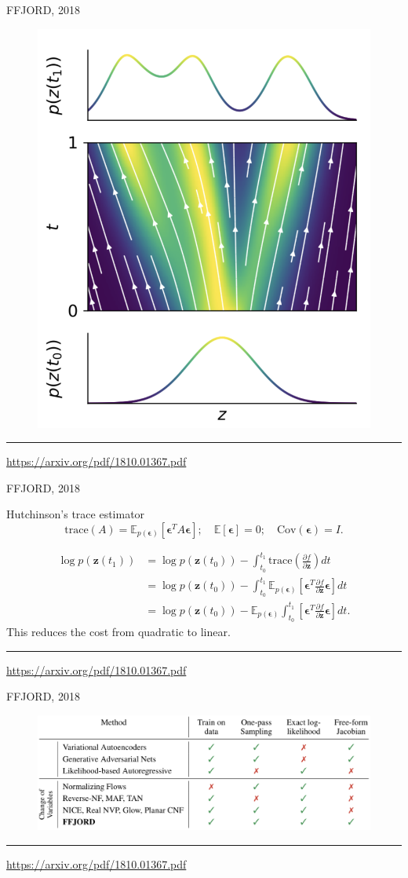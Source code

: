 \documentclass{beamer}
\newcommand{\bz}{\mathbf{z}}
\newcommand{\bepsilon}{\boldsymbol{\epsilon}}
\begin{document}
\begin{frame}{FFJORD, 2018}
\begin{figure}
    \centering
    \includegraphics[width=0.5\linewidth]{figs/cnf_flow.png}
\end{figure}
\vfill
\hrule\medskip
{\scriptsize \href{https://arxiv.org/pdf/1810.01367.pdf}{https://arxiv.org/pdf/1810.01367.pdf}} 
\end{frame}
\begin{frame}{FFJORD, 2018}
\begin{block}{Hutchinson's trace estimator}
\[
    \text{trace}(A) = \mathbb{E}_{p(\bepsilon)} \left[ \bepsilon^T A \bepsilon \right]; \quad \mathbb{E} [\bepsilon] = 0; \quad \text{Cov} (\bepsilon) = I.
\]
\end{block}
\begin{align*}
    \log p(\bz(t_1)) &= \log p(\bz(t_0)) - \int_{t_0}^{t_1} \text{trace} \left( \frac{\partial f}{\partial \bz} \right) dt \\
    &= \log p(\bz(t_0)) - \int_{t_0}^{t_1} \mathbb{E}_{p(\bepsilon)} \left[ \bepsilon^T \frac{\partial f}{\partial \bz} \bepsilon \right] dt \\
    &= \log p(\bz(t_0)) - \mathbb{E}_{p(\bepsilon)} \int_{t_0}^{t_1} \left[ \bepsilon^T \frac{\partial f}{\partial \bz} \bepsilon \right] dt.
\end{align*}
This reduces the cost from quadratic to linear.\\
\vfill
\hrule\medskip
{\scriptsize \href{https://arxiv.org/pdf/1810.01367.pdf}{https://arxiv.org/pdf/1810.01367.pdf}} 
\end{frame}
\begin{frame}{FFJORD, 2018}
\begin{figure}
    \centering
    \includegraphics[width=\linewidth]{figs/flow_comparison.png}
\end{figure}
\vfill
\hrule\medskip
{\scriptsize \href{https://arxiv.org/pdf/1810.01367.pdf}{https://arxiv.org/pdf/1810.01367.pdf}} 
\end{frame}
\end{document}

